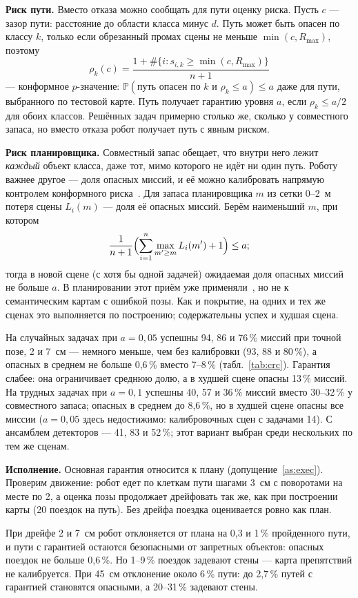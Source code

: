 \documentclass[conference,a4paper]{IEEEtran}
\theoremstyle{definition}
\begin{document}
\textbf{Риск пути.} Вместо отказа можно сообщать для пути оценку риска. Пусть $c$ --- зазор пути: расстояние до
области класса минус $d$. Путь может быть опасен по классу $k$, только если обрезанный промах сцены не меньше
$\min(c, R_{\max})$, поэтому
\[
  \rho_k(c) = \frac{1 + \#\{i : s_{i,k} \ge \min(c, R_{\max})\}}{n + 1}
\]
--- конформное $p$-значение: $\mathbb P(\text{путь опасен по } k \text{ и } \rho_k \le a) \le a$ даже для пути,
выбранного по тестовой карте. Путь получает гарантию уровня $a$, если $\rho_k \le a/2$ для обоих классов. Решённых задач
примерно столько же, сколько у совместного запаса, но вместо отказа робот получает путь с явным риском.

\textbf{Риск планировщика.} Совместный запас обещает, что внутри него лежит \emph{каждый} объект класса, даже тот,
мимо которого не идёт ни один путь. Роботу важнее другое --- доля опасных миссий, и её можно калибровать напрямую
контролем конформного риска~\cite{crc}. Для запаса планировщика $m$ из сетки 0--2~м потеря сцены $L_i(m)$ --- доля её
опасных миссий. Берём наименьший $m$, при котором
\[
  \frac{1}{n+1}\Bigl(\sum_{i=1}^{n} \max_{m' \ge m} L_i(m') + 1\Bigr) \le a;
\]
тогда в новой сцене (с хотя бы одной задачей) ожидаемая доля опасных миссий не больше $a$. В планировании этот приём уже
применяли~\cite{gonzales,eom}, но не к семантическим картам с ошибкой позы. Как и покрытие, на одних и тех же сценах это
выполняется по построению; содержательны успех и худшая сцена.

На случайных задачах при $a = 0{,}05$ успешны 94, 86 и 76\,\% миссий при точной позе, 2 и 7~см --- немного меньше, чем
без калибровки (93, 88 и 80\,\%), а опасных в среднем не больше 0,6\,\% вместо 7--8\,\% (табл.~\ref{tab:crc}). Гарантия
слабее: она ограничивает среднюю долю, а в худшей сцене опасны 13\,\% миссий. На трудных задачах при $a = 0{,}1$
успешны 40, 57 и 36\,\% миссий вместо 30--32\,\% у совместного запаса; опасных в среднем до 8,6\,\%, но в худшей сцене
опасны все миссии ($a = 0{,}05$ здесь недостижимо: калибровочных сцен с задачами 14). С ансамблем детекторов --- 41, 83
и 52\,\%; этот вариант выбран среди нескольких по тем же сценам.

\textbf{Исполнение.} Основная гарантия относится к плану (допущение~\ref{as:exec}). Проверим движение: робот едет
по клеткам пути шагами 3~см с поворотами на месте по 2\textdegree{}, а оценка позы продолжает дрейфовать так же, как при
построении карты (20 поездок на путь). Без дрейфа поездка оценивается ровно как план.

При дрейфе 2 и 7~см робот отклоняется от плана на 0,3 и 1\,\% пройденного пути, и пути с гарантией остаются безопасными
от запретных объектов: опасных поездок не больше 0,6\,\%. Но 1--9\,\% поездок задевают стены --- карта препятствий не
калибруется. При 45~см отклонение около 6\,\% пути: до 2,7\,\% путей с гарантией становятся опасными, а 20--31\,\%
задевают стены.
\end{document}
